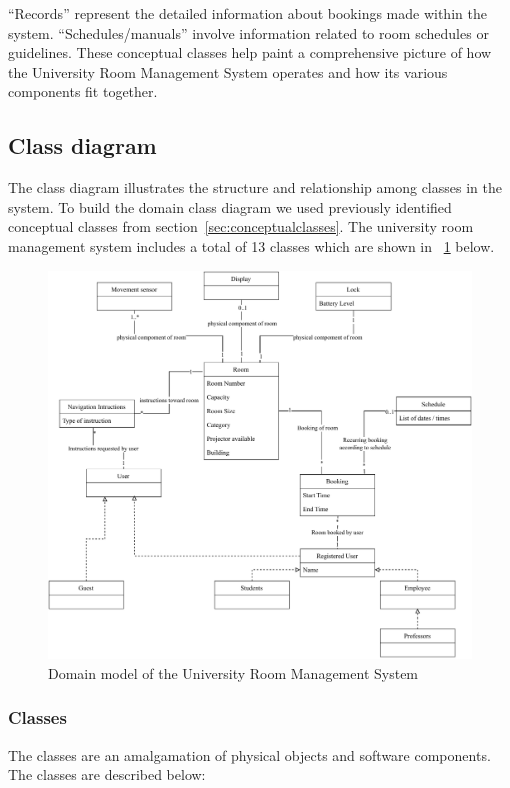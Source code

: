 \documentclass[conference,onecolumn]{IEEEtran}
\begin{document}
	``Records'' represent the detailed information about bookings made within the system. ``Schedules/manuals'' involve information related to room schedules or guidelines. These conceptual classes help paint a comprehensive picture of how the University Room Management System operates and how its various components fit together.

\subsection{Class diagram}
	The class diagram illustrates the structure and relationship among classes in the system. To build the domain class diagram we used previously identified conceptual classes from section~\ref{sec:conceptualclasses}. The university room management system includes a total of 13 classes which are shown in \figurename~\ref{fig:classdiagram} below.

	\begin{figure}[H]
		\centering
		\includegraphics[width=1\textwidth]{Figures/DomainModel.pdf}
		\caption{Domain model of the University Room Management System}
		\label{fig:classdiagram}
	\end{figure}

	\subsubsection*{Classes} \label{sec:classes}
		The classes are an amalgamation of physical objects and software components. The classes are described below:
		
\end{document}
